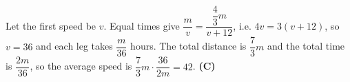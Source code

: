 Let the first speed be $v$. Equal times give $\dfrac mv=\dfrac{\dfrac43m}{v+12}$, i.e. $4v=3(v+12)$, so $v=36$ and each leg takes $\dfrac m{36}$ hours. The total distance is $\dfrac73m$ and the total time is $\dfrac{2m}{36}$, so the average speed is $\dfrac73m\cdot\dfrac{36}{2m}=42$. \textbf{(C)}
